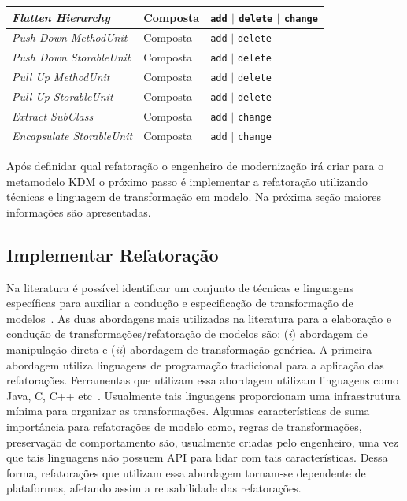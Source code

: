 \begin{table}[h]
\begin{center}
\begin{tabular}{ | m{4.5cm} | m{2.5cm} | m{4cm}| }
\hline
\textit{Flatten Hierarchy} &  Composta & \texttt{add} $|$ \texttt{delete} $|$ \texttt{change}\\ 
\hline
\textit{Push Down MethodUnit} &  Composta & \texttt{add} $|$ \texttt{delete}\\ 
\hline
\textit{Push Down StorableUnit} &  Composta & \texttt{add} $|$ \texttt{delete}\\ 
\hline
\textit{Pull Up MethodUnit} &  Composta & \texttt{add} $|$ \texttt{delete}\\
\hline
\textit{Pull Up StorableUnit} &  Composta & \texttt{add} $|$ \texttt{delete}\\
\hline
\textit{Extract SubClass} &  Composta & \texttt{add} $|$ \texttt{change}\\
\hline
\textit{Encapsulate StorableUnit} &  Composta & \texttt{add} $|$ \texttt{change}\\
\hline
\end{tabular}
\end{center}
\end{table}

Após definidar qual refatoração o engenheiro de modernização irá criar para o metamodelo KDM o próximo passo é implementar a refatoração utilizando técnicas e linguagem de transformação em modelo. Na próxima seção maiores informações são apresentadas.

\subsection{Implementar Refatoração}\label{sec:linguagemDeTransformacaoUtilizada}

Na literatura é possível identificar um conjunto de técnicas e linguagens específicas para auxiliar a condução e especificação de transformação de modelos~\cite{Biehl_2010, Mens_2006, Allilaire_06}. As duas abordagens mais utilizadas na literatura para a elaboração e condução de transformações/refatoração de modelos são: (\textit{i}) abordagem de manipulação direta e (\textit{ii}) abordagem de transformação genérica. A primeira abordagem utiliza linguagens de programação tradicional para a aplicação das refatorações. Ferramentas que utilizam essa abordagem utilizam linguagens como Java, C, C++ etc~\cite{Bruneliere_2014}. Usualmente tais linguagens proporcionam uma infraestrutura mínima para organizar as transformações. Algumas características de suma importância para refatorações de modelo como, regras de transformações, preservação de comportamento são, usualmente criadas pelo engenheiro, uma vez que tais linguagens não possuem API para lidar com tais características. Dessa forma, refatorações que utilizam essa abordagem tornam-se dependente de plataformas, afetando assim a reusabilidade das refatorações. 

